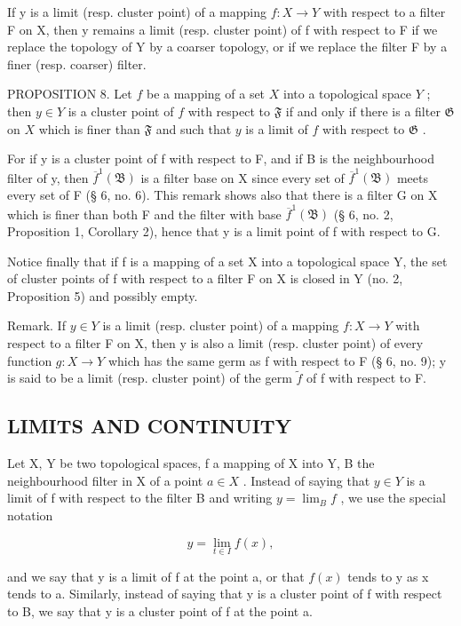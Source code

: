If y is a limit (resp. cluster point) of a mapping \(f: X \rightarrow Y\) with respect to a filter F on X, then y remains a limit (resp. cluster point) of f with respect to F if we replace the topology of Y by a coarser topology, or if we replace the filter F by a finer (resp. coarser) filter.

PROPOSITION 8. Let \(f\) be a mapping of a set \(X\) into a topological space \(Y\) ; then \(y \in Y\) is a cluster point of \(f\) with respect to \(\mathfrak{F}\) if and only if there is a filter \(\mathfrak{G}\) on \(X\) which is finer than \(\mathfrak{F}\) and such that \(y\) is a limit of \(f\) with respect to \(\mathfrak{G}\) .

For if y is a cluster point of f with respect to F, and if B is the neighbourhood filter of y, then \(\overline{f}^{1}(\mathfrak{B})\) is a filter base on X since every set of \(\overline{f}^{1}(\mathfrak{B})\) meets every set of F (§ 6, no. 6). This remark shows also that there is a filter G on X which is finer than both F and the filter with base \(\overline{f}^{1}(\mathfrak{B})\) (§ 6, no. 2, Proposition 1, Corollary 2), hence that y is a limit point of f with respect to G.

Notice finally that if f is a mapping of a set X into a topological space Y, the set of cluster points of f with respect to a filter F on X is closed in Y (no. 2, Proposition 5) and possibly empty.

Remark. If \(y \in Y\) is a limit (resp. cluster point) of a mapping \(f: X \to Y\) with respect to a filter F on X, then y is also a limit (resp. cluster point) of every function \(g: X \to Y\) which has the same germ as f with respect to F (§ 6, no. 9); y is said to be a limit (resp. cluster point) of the germ \(\tilde{f}\) of f with respect to F.

\subsection{LIMITS AND CONTINUITY}

Let X, Y be two topological spaces, f a mapping of X into Y, B the neighbourhood filter in X of a point \(a \in X\) . Instead of saying that \(y \in Y\) is a limit of f with respect to the filter B and writing \(y = \lim_{B} f\) , we use the special notation

\[
y = \lim _ {t \in I} f (x),
\]

and we say that y is a limit of f at the point a, or that \(f(x)\) tends to y as x tends to a. Similarly, instead of saying that y is a cluster point of f with respect to B, we say that y is a cluster point of f at the point a.

